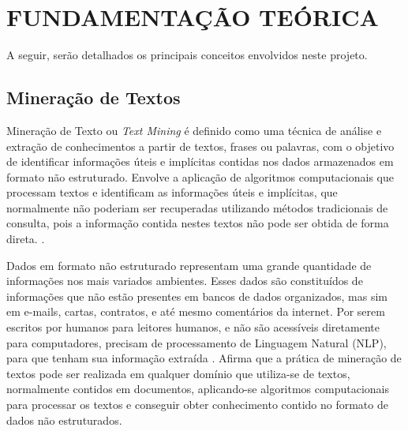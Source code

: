 \section{FUNDAMENTAÇÃO TEÓRICA}

A seguir, serão detalhados os principais conceitos envolvidos neste projeto.

\subsection{Mineração de Textos}
Mineração de Texto ou \textit{Text Mining} é definido como uma técnica de análise e extração de conhecimentos a partir de textos, frases ou palavras, com o objetivo de identificar informações úteis e implícitas contidas nos dados armazenados em formato não estruturado. Envolve a aplicação de algoritmos computacionais que processam textos e identificam as informações úteis e implícitas, que normalmente não poderiam ser recuperadas utilizando métodos tradicionais de consulta, pois a informação contida nestes textos não pode ser obtida de forma direta. \cite{morais2007mineraccao}.

Dados em formato não estruturado representam uma grande quantidade de informações nos mais variados ambientes. Esses dados são constituídos de informações que não estão presentes em bancos de dados organizados, mas sim em e-mails, cartas, contratos, e até mesmo comentários da internet. Por serem escritos por humanos para leitores humanos, e não são acessíveis diretamente para computadores, precisam de processamento de Linguagem Natural (NLP), para que tenham sua informação extraída \cite{Dorre1999TMFTextMining}.  Afirma que a prática de mineração de textos pode ser realizada em qualquer domínio que utiliza-se de textos, normalmente contidos em documentos, aplicando-se algoritmos computacionais para processar os textos e conseguir obter conhecimento contido no formato de dados não estruturados. 

